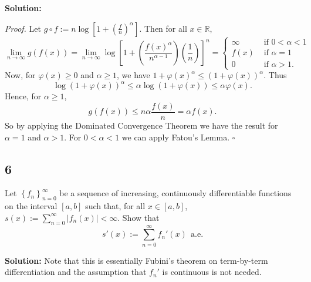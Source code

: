 \documentclass[12pt]{article}
\newcounter{ProofCounter}
\newenvironment{Proof}{\stepcounter{ProofCounter}\textit{Proof.}}{\hfill$\square$}
\begin{document}
{\bf Solution:}

\begin{Proof}
Let $g\circ f := n\log\left[ 1 + \left( \frac{f}{n} \right)^{\alpha} \right]$. Then for all $x \in \mathbb{R}$,
\begin{equation}
\lim_{n\rightarrow\infty}g(f(x)) = \lim_{n\rightarrow\infty}\log\left[ 1 + \left( \frac{f(x)^{\alpha}}{n^{\alpha - 1}} \right)\left( \frac{1}{n} \right)
 \right]^{n} = \left\{ \begin{array}{cl}
\infty & \text{ if } 0 < \alpha < 1 \\
f(x) & \text{ if } \alpha = 1 \\
0 & \text{ if } \alpha > 1.
\end{array} \right.
\label{2.5.1}
\end{equation}
Now, for $\varphi(x) \geq 0$ and $\alpha \geq 1$, we have $1 + \varphi(x)^{\alpha} \leq (1 + \varphi(x))^{\alpha}$. Thus 
\[ \log(1 + \varphi(x))^{\alpha} \leq \alpha \log(1 + \varphi(x)) \leq \alpha \varphi(x). \]
Hence, for $\alpha \geq 1$,
\[ g(f(x)) \leq n\alpha\frac{f(x)}{n} = \alpha f(x). \]
So by applying the Dominated Convergence Theorem we have the result for $\alpha = 1$ and $\alpha > 1$. For $0 < \alpha < 1$ we can apply Fatou's Lemma.
\end{Proof}


\newpage
\subsection*{6}
Let $\left\{ f_{n} \right\}_{n=0}^{\infty}$ be a sequence of increasing, continuously differentiable functions on the interval $[a,b]$ such that, for
all $x \in [a,b]$, $s(x) := \sum_{n=0}^{\infty}|f_{n}(x)| < \infty$.
Show that 
\[ s'(x) := \sum_{n=0}^{\infty}f_{n}'(x)\ \ \text{a.e.} \]

{\bf Solution:} Note that this is essentially Fubini's theorem on term-by-term differentiation and the assumption that $f_{n}'$ is continuous is not
needed.
\end{document}
